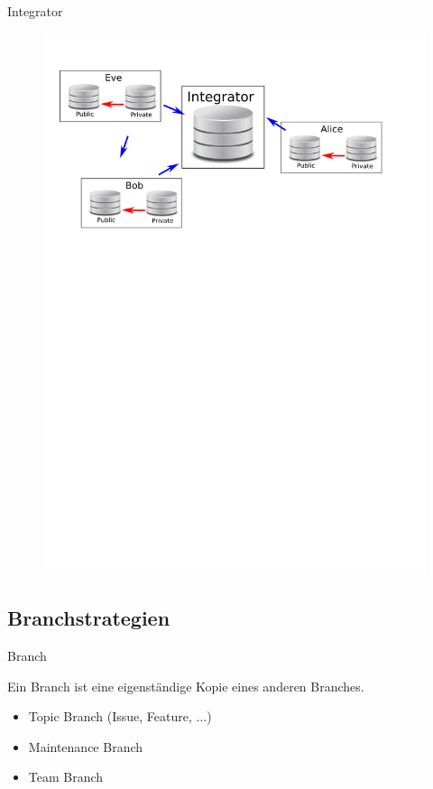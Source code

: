 \documentclass[presentation]{beamer}
\begin{document}
\begin{frame}{Integrator}
  \begin{figure}
    \centering
    \includegraphics[width=\textwidth]{img/integrator-setup}
  \end{figure}
\end{frame}
\subsection{Branchstrategien}
\begin{frame}{Branch}
  \begin{definition}
    Ein \alert{Branch} ist eine eigenständige Kopie eines anderen Branches.
  \end{definition}
\end{frame}
\begin{frame}
  \begin{itemize}[<+->]
  \item Topic Branch (Issue, Feature, ...)
  \item Maintenance Branch
  \item Team Branch
  \end{itemize}
\end{frame}
\end{document}
